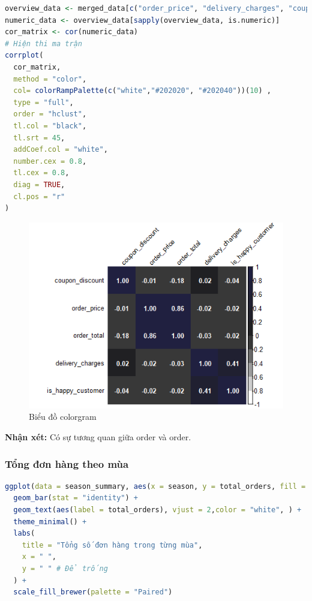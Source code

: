 \begin{lstlisting}[language=R,caption=Code kiểm tra độ tương quan]
overview_data <- merged_data[c("order_price", "delivery_charges", "coupon_discount","order_total", "is_expedited_delivery", "is_happy_customer", "shopping_cart")]
numeric_data <- overview_data[sapply(overview_data, is.numeric)]
cor_matrix <- cor(numeric_data)
# Hiện thi ma trận
corrplot(
  cor_matrix,
  method = "color",
  col= colorRampPalette(c("white","#202020", "#202040"))(10) ,
  type = "full",
  order = "hclust",
  tl.col = "black",
  tl.srt = 45,
  addCoef.col = "white",
  number.cex = 0.8,
  tl.cex = 0.8,
  diag = TRUE,
  cl.pos = "r"
)
\end{lstlisting}
\begin{figure}[H]
    \centering \includegraphics[width=15cm]{Images/img/4.3_plotting_data/order_price_total.png}
    \caption{Biểu đồ colorgram}
\end{figure}

\begin{boxH}
\textbf{Nhận xét:} Có sự tương quan giữa order và order.
\end{boxH}
\subsubsection{Tổng đơn hàng theo mùa}
\begin{lstlisting}[language=R, caption=Đồ thị thể hiện tổng số đơn hàng theo từng mùa]
ggplot(data = season_summary, aes(x = season, y = total_orders, fill = season)) +
  geom_bar(stat = "identity") +
  geom_text(aes(label = total_orders), vjust = 2,color = "white", ) +
  theme_minimal() +
  labs(
    title = "Tổng số đơn hàng trong từng mùa",
    x = " ",
    y = " " # Để trống
  ) +
  scale_fill_brewer(palette = "Paired")
\end{lstlisting}

